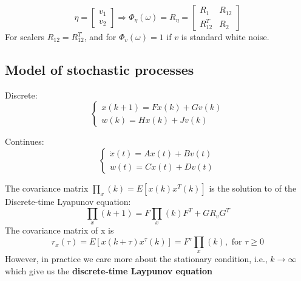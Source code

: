 \begin{multicols}{2}
\begin{equation*}
    \eta = \begin{bmatrix} v_1 \\ v_2 \end{bmatrix} 
    \Rightarrow \Phi_{\eta}(\omega)=R_{\eta}=
    \begin{bmatrix} R_1 & R_{12} \\ R_{12}^T & R_2 \end{bmatrix}
\end{equation*}
For scalers $R_{12} = R_{12}^T$, and for $\Phi_v(\omega)=1$ if $v$ is 
standard white noise.

\subsection{Model of stochastic processes}
Discrete:
\begin{equation*}
    \begin{cases}
        x(k+1) = Fx(k) + Gv(k) \\
        w(k) = Hx(k) + Jv(k)
    \end{cases} \end{equation*}

Continues:
\begin{equation*}
    \begin{cases}
        \dot{x}(t) = Ax(t) + Bv(t) \\
        w(t) = Cx(t) + Dv(t)
    \end{cases}
\end{equation*}

The covariance matrix $\prod_x(k) = E[x(k)x^T(k)]$ is the solution to of the\newline
Discrete-time Lyapunov equation:
\begin{equation*}
    \prod_x(k+1) = F\prod_x(k)F^T + GR_vG^T
\end{equation*}
The covariance matrix of x is
\begin{equation*}
    r_x(\tau) = E[x(k+\tau)x^{\tau}(k)] = F^{\tau}\prod_x(k), \text{ for } \tau\geq0
\end{equation*}
However, in practice we care more about the stationary condition, i.e., $k\to\infty$ which give us
the \textbf{discrete-time Laypunov equation}


\end{multicols}
